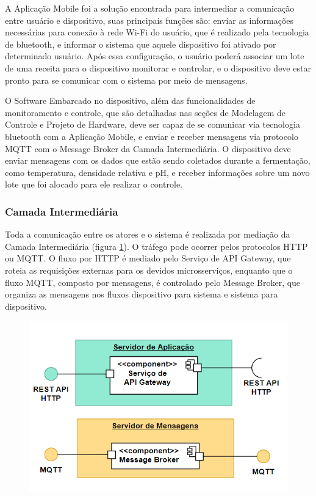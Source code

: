 A Aplicação Mobile foi a solução encontrada para intermediar a comunicação entre usuário e dispositivo, suas principais funções são: enviar as informações necessárias para conexão à rede Wi-Fi do usuário, que é realizado pela tecnologia de bluetooth, e informar o sistema que aquele dispositivo foi ativado por determinado usuário. Após essa configuração, o usuário poderá associar um lote de uma receita para o dispositivo monitorar e controlar, e o dispositivo deve estar pronto para se comunicar com o sistema por meio de mensagens.

O Software Embarcado no dispositivo, além das funcionalidades de monitoramento e controle, que são detalhadas nas seções de Modelagem de Controle e Projeto de Hardware, deve ser capaz de se comunicar via tecnologia bluetooth com a Aplicação Mobile, e enviar e receber mensagens via protocolo MQTT com o Message Broker da Camada Intermediária. O dispositivo deve enviar mensagens com os dados que estão sendo coletados durante a fermentação, como temperatura, densidade relativa e pH, e receber informações sobre um novo lote que foi alocado para ele realizar o controle.

\subsubsection{Camada Intermediária}

Toda a comunicação entre os atores e o sistema é realizada por mediação da Camada Intermediária (figura \ref{fig:camada_intermediaria}). O tráfego pode ocorrer pelos protocolos HTTP ou MQTT. O fluxo por HTTP é mediado pelo Serviço de API Gateway, que roteia as requisições externas para os devidos microsserviços, enquanto que o fluxo MQTT, composto por mensagens, é controlado pelo Message Broker, que organiza as mensagens nos fluxos dispositivo para sistema e sistema para dispositivo.

\begin{figure}[H]
    \centering
    \includegraphics[scale=0.50]{figuras/projeto/software/camada_intermediaria.PNG}
    \label{fig:camada_intermediaria}
\end{figure}


